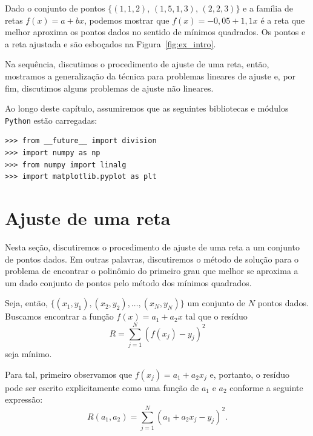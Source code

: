 \begin{ex}\label{ex:intro_ajuste}
  Dado o conjunto de pontos $\{(1, 1,2)$, $(1,5, 1,3)$, $(2, 2,3)\}$ e a família de retas $f(x) = a + bx$, podemos mostrar que $f(x) = -0,05 + 1,1x$ é a reta que melhor aproxima os pontos dados no sentido de mínimos quadrados.  Os pontos e a reta ajustada e são esboçados na Figura~\ref{fig:ex_intro}.
\end{ex}

Na sequência, discutimos o procedimento de ajuste de uma reta, então, mostramos a generalização da técnica para problemas lineares de ajuste e, por fim, discutimos alguns problemas de ajuste não lineares.

\ifispython
  Ao longo deste capítulo, assumiremos que as seguintes bibliotecas e módulos \verb+Python+ estão carregadas:
\begin{verbatim}
>>> from __future__ import division
>>> import numpy as np
>>> from numpy import linalg
>>> import matplotlib.pyplot as plt
\end{verbatim}
\fi


\section{Ajuste de uma reta}

Nesta seção, discutiremos o procedimento de ajuste de uma reta a um conjunto de pontos dados. Em outras palavras, discutiremos o método de solução para o problema de encontrar o polinômio do primeiro grau que melhor se aproxima a um dado conjunto de pontos pelo método dos mínimos quadrados.

Seja, então, $\{(x_1,y_1), (x_2,y_2),\ldots, (x_N,y_N)\}$ um conjunto de $N$ pontos dados. Buscamos encontrar a função $f(x) = a_1 + a_2x$ tal que o resíduo
\begin{equation}
  R = \sum_{j=1}^N (f(x_j)-y_j)^2
\end{equation}
seja mínimo.

Para tal, primeiro observamos que $f(x_j)=a_1+a_2 x_j$ e, portanto, o resíduo pode ser escrito explicitamente como uma função de $a_1$ e $a_2$ conforme a seguinte expressão:
\begin{equation}
  R(a_1,a_2) = \sum_{j=1}^N (a_1 + a_2x_j - y_j)^2.
\end{equation}


